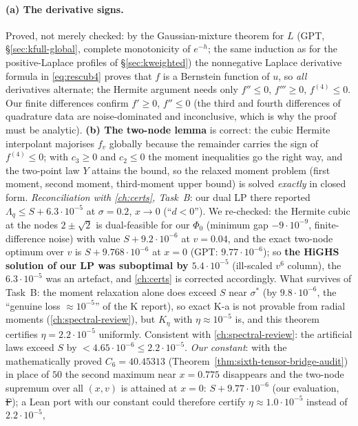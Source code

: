 \paragraph{(a) The derivative signs.} Proved, not merely checked: by the Gaussian-mixture theorem for $L$ (GPT, \S\ref{sec:kfull-global}, complete monotonicity of $e^{-h}$; the same
induction as for the positive-Laplace profiles of \S\ref{sec:kweighted}) the nonnegative Laplace derivative formula in \eqref{eq:rescub4} proves that $f$ is a Bernstein function of $u$, so \emph{all} derivatives alternate; the Hermite
argument needs only $f''\le0$, $f'''\ge0$, $f^{(4)}\le0$. Our finite differences confirm $f'\ge0$, $f''\le0$ (the third and fourth differences of quadrature data are noise-dominated and
inconclusive, which is why the proof must be analytic). \textbf{(b) The two-node lemma} is correct: the cubic Hermite interpolant majorises $f_v$ globally because the remainder carries the sign of
$f^{(4)}\le0$; with $c_3\ge0$ and $c_2\le0$ the moment inequalities go the right way, and the two-point law $Y$ attains the bound, so the relaxed moment problem (first moment, second moment,
third-moment upper bound) is solved \emph{exactly} in closed form. \emph{Reconciliation with \autoref{ch:certs}, Task~B}: our dual LP there reported $\Lambda_q\le S+6.3\cdot10^{-5}$ at
$\sigma=0.2$, $x\to0$ (``$d<0$''). We re-checked: the Hermite cubic at the nodes $2\pm\sqrt2$ is dual-feasible for our $\Phi_0$ (minimum gap $-9\cdot10^{-9}$, finite-difference noise) with value
$S+9.2\cdot10^{-6}$ at $v=0.04$, and the exact two-node optimum over $v$ is $S+9.768\cdot10^{-6}$ at $x=0$ (GPT: $9.77\cdot10^{-6}$); so \textbf{the HiGHS solution of our LP was suboptimal by
$5.4\cdot10^{-5}$} (ill-scaled $v^6$ column), the $6.3\cdot10^{-5}$ was an artefact, and \autoref{ch:certs} is corrected accordingly. What survives of Task~B: the moment relaxation alone does
exceed $S$ near $\sigma^*$ (by $9.8\cdot10^{-6}$, the ``genuine loss $\approx10^{-5}$'' of the K report), so exact K-a is not provable from radial moments (\autoref{ch:spectral-review}), but
$K_\eta$ with $\eta\approx10^{-5}$ is, and this theorem certifies $\eta=2.2\cdot10^{-5}$ uniformly. Consistent with \autoref{ch:spectral-review}: the artificial laws exceed $S$ by
$<4.65\cdot10^{-6}\le2.2\cdot10^{-5}$. \emph{Our constant}: with the mathematically proved $C_6=40.45313$ (Theorem~\ref{thm:sixth-tensor-bridge-audit}) in place of $50$ the second maximum near $x=0.775$ disappears and the two-node supremum over all
$(x,v)$ is attained at $x=0$: $S+9.77\cdot10^{-6}$ (our evaluation, \st{F}); a Lean port with our constant could therefore certify $\eta\approx1.0\cdot10^{-5}$ instead of $2.2\cdot10^{-5}$,
